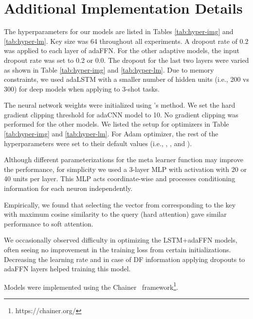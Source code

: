 \documentclass{article}
\begin{document}
\clearpage

\appendix

\section{Additional Implementation Details}
\label{sec:imp_details}

The hyperparameters for our models are listed in Tables \ref{tab:hyper-img} and \ref{tab:hyper-lm}. Key size  was 64 throughout all experiments. A dropout rate of 0.2 was applied to each layer of adaFFN. For the other adaptive models, the input dropout rate was set to 0.2 or 0.0. The dropout for the last two layers were varied as shown in Table \ref{tab:hyper-img} and \ref{tab:hyper-lm}. Due to memory constraints, we used adaLSTM with a smaller number of hidden units (i.e., 200 vs 300) for deep models when applying to 3-shot tasks.

The neural network weights were initialized using \citet{he2015delving}'s method. We set the hard gradient clipping threshold for adaCNN model to 10. No gradient clipping was performed for the other models. We listed the setup for optimizers in Table \ref{tab:hyper-img} and \ref{tab:hyper-lm}. For Adam optimizer, the rest of the hyperparameters were set to their default values (i.e., , , and ).

Although different parameterizations for the meta learner function  may improve the performance, for simplicity we used a 3-layer MLP with  activation with 20 or 40 units per layer. This MLP acts coordinate-wise and processes conditioning information for each neuron independently.

Empirically, we found that selecting the vector from  corresponding to the key  with maximum cosine similarity to the query  (hard attention) gave similar performance to soft attention.

We occasionally observed difficulty in optimizing the LSTM+adaFFN models, often seeing no improvement in the training loss from certain initializations. Decreasing the learning rate and in case of DF information applying dropouts to adaFFN layers helped training this model.

Models were implemented using the Chainer~\citep{chainer_learningsys2015} framework\footnote{https://chainer.org/}.
\end{document}
